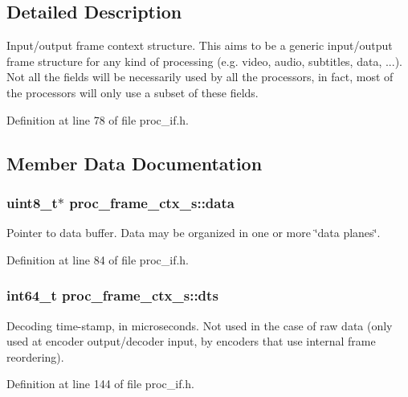 \subsection{Detailed Description}
Input/output frame context structure. This aims to be a generic input/output frame structure for any kind of processing (e.\+g. video, audio, subtitles, data, ...). Not all the fields will be necessarily used by all the processors, in fact, most of the processors will only use a subset of these fields. 

Definition at line 78 of file proc\+\_\+if.\+h.



\subsection{Member Data Documentation}
\subsubsection[{\texorpdfstring{data}{data}}]{\setlength{\rightskip}{0pt plus 5cm}uint8\+\_\+t$\ast$ proc\+\_\+frame\+\_\+ctx\+\_\+s\+::data}\hypertarget{structproc__frame__ctx__s_ae3e8c9753324e6798ef8613fd3e772d2}{}\label{structproc__frame__ctx__s_ae3e8c9753324e6798ef8613fd3e772d2}
Pointer to data buffer. Data may be organized in one or more \char`\"{}data planes\char`\"{}. 

Definition at line 84 of file proc\+\_\+if.\+h.

\subsubsection[{\texorpdfstring{dts}{dts}}]{\setlength{\rightskip}{0pt plus 5cm}int64\+\_\+t proc\+\_\+frame\+\_\+ctx\+\_\+s\+::dts}\hypertarget{structproc__frame__ctx__s_a7300cb89fc1872dbcad499aa4d8435dd}{}\label{structproc__frame__ctx__s_a7300cb89fc1872dbcad499aa4d8435dd}
Decoding time-\/stamp, in microseconds. Not used in the case of raw data (only used at encoder output/decoder input, by encoders that use internal frame reordering). 

Definition at line 144 of file proc\+\_\+if.\+h.

